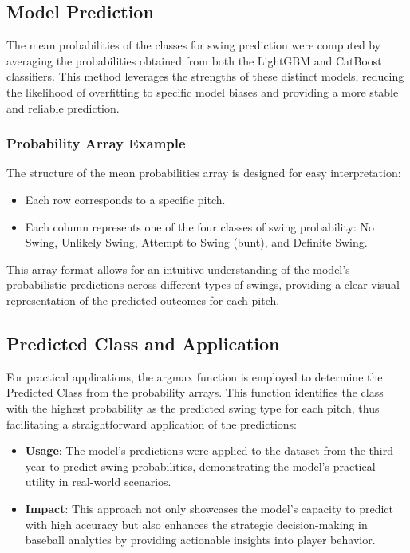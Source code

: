 \documentclass[12pt]{article}
\begin{document}
\subsection*{Model Prediction}
The mean probabilities of the classes for swing prediction were computed by averaging the probabilities obtained from both the LightGBM and CatBoost classifiers. This method leverages the strengths of these distinct models, reducing the likelihood of overfitting to specific model biases and providing a more stable and reliable prediction.

\subsubsection*{Probability Array Example}
The structure of the mean probabilities array is designed for easy interpretation:
\begin{itemize}
    \item Each row corresponds to a specific pitch.
    \item Each column represents one of the four classes of swing probability: No Swing, Unlikely Swing, Attempt to Swing (bunt), and Definite Swing.
\end{itemize}
This array format allows for an intuitive understanding of the model’s probabilistic predictions across different types of swings, providing a clear visual representation of the predicted outcomes for each pitch.

\subsection*{Predicted Class and Application}
For practical applications, the argmax function is employed to determine the Predicted Class from the probability arrays. This function identifies the class with the highest probability as the predicted swing type for each pitch, thus facilitating a straightforward application of the predictions:
\begin{itemize}
    \item \textbf{Usage}: The model's predictions were applied to the dataset from the third year to predict swing probabilities, demonstrating the model's practical utility in real-world scenarios.
    \item \textbf{Impact}: This approach not only showcases the model’s capacity to predict with high accuracy but also enhances the strategic decision-making in baseball analytics by providing actionable insights into player behavior.
\end{itemize}
\end{document}
